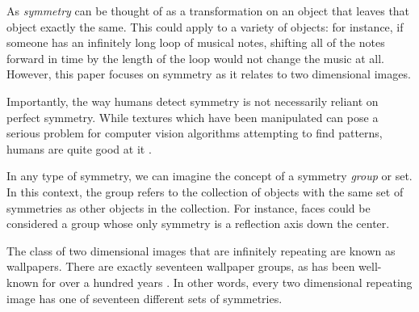 As \textit{symmetry} can be thought of as a transformation on an object that leaves that object exactly the same. This could apply to a variety of objects: for instance, if someone has an infinitely long loop of musical notes, shifting all of the notes forward in time by the length of the loop would not change the music at all. However, this paper focuses on symmetry as it relates to two dimensional images.

Importantly, the way humans detect symmetry is not necessarily reliant on perfect symmetry. While textures which have been manipulated can pose a serious problem for computer vision algorithms attempting to find patterns, humans are quite good at it \cite{nearregular}.

In any type of symmetry, we can imagine the concept of a symmetry \textit{group} or set. In this context, the group refers to the collection of objects with the same set of symmetries as other objects in the collection. For instance, faces could be considered a group whose only symmetry is a reflection axis down the center.

The class of two dimensional images that are infinitely repeating are known as wallpapers. There are exactly seventeen wallpaper groups, as has been well-known for over a hundred years \cite{wallpaper-proof}. In other words, every two dimensional repeating image has one of seventeen different sets of symmetries.
